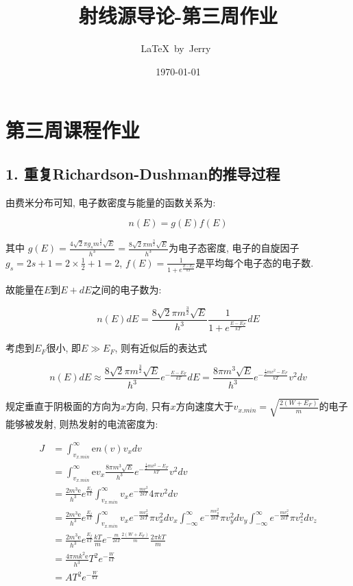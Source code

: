 \documentclass{article}
\title{射线源导论-第三周作业}
\author{\LaTeX\ by\ Jerry\ }
\date{\today}
\begin{document}
\pagestyle{fancy}

\fancyhead[R]{\today}

\section*{第三周课程作业}

\subsection*{1. 重复Richardson-Dushman的推导过程}

由费米分布可知, 电子数密度与能量的函数关系为:

$$n(E) = g(E) f(E)$$

其中 $g(E) = \frac{4\sqrt{2}\pi g_s m^{\frac{3}{2}}\sqrt{E}}{h^3} = \frac{8\sqrt{2}\pi m^{\frac{3}{2}}\sqrt{E}}{h^3}$为电子态密度, 电子的自旋因子$g_s = 2s + 1 = 2 \times \frac{1}{2} + 1 = 2$, $f(E)=\frac{1}{1+e^{\frac{E-E_F}{kT}}}$是平均每个电子态的电子数.

故能量在$E$到$E+dE$之间的电子数为:

$$n(E)dE = \frac{8\sqrt{2}\pi m^{\frac{3}{2}}\sqrt{E}}{h^3} \frac{1}{1+e^{\frac{E-E_F}{kT}}}dE$$

考虑到$E_F$很小, 即$E \gg E_F $, 则有近似后的表达式

$$n(E)dE \approx \frac{8\sqrt{2}\pi m^{\frac{3}{2}}\sqrt{E}}{h^3} e^{- \frac{E-E_F}{kT}}dE = \frac{8\pi m^{3}\sqrt{E}}{h^3} e^{- \frac{\frac{1}{2}mv^2-E_F}{kT}}v^2dv$$

规定垂直于阴极面的方向为$x$方向, 只有$x$方向速度大于$v_{x.min} = \sqrt{\frac{2(W+E_F)}{m}}$的电子能够被发射, 则热发射的电流密度为:

\begin{equation*}
    \begin{aligned}
        J &= \int_{v_{x.min}}^{\infty} \text{e} n(v) v_x dv \\
        &= \int_{v_{x.min}}^{\infty} \text{e} v_x \frac{8\pi m^{3}\sqrt{E}}{h^3} e^{- \frac{\frac{1}{2}mv^2-E_F}{kT}}v^2dv \\
        &= \frac{2m^3\text{e}}{h^3} e^{\frac{E_f}{kT}} \int_{v_{x.min}}^{\infty} v_x e^{-\frac{mv^2}{2kT}}4\pi v^2 dv\\
        &= \frac{2m^3\text{e}}{h^3} e^{\frac{E_f}{kT}} \int_{v_{x.min}}^{\infty} v_x e^{-\frac{mv_x^2}{2kT}}\pi v_x^2 dv_x \int_{-\infty}^{\infty} e^{-\frac{mv_y^2}{2kT}}\pi v_y^2 dv_y \int_{-\infty}^{\infty} e^{-\frac{mv_z^2}{2kT}}\pi v_z^2 dv_z\\
        &= \frac{2m^3\text{e}}{h^3} e^{\frac{E_f}{kT}}\frac{kT}{m}e^{-\frac{m}{2kT}\frac{2(W+E_F)}{m}}\frac{2\pi kT}{m}\\
        &= \frac{4\pi m k^2 \text{e}}{h^3} T^2 e^{-\frac{W}{kT}}\\
        &= A T^2 e^{-\frac{W}{kT}}
    \end{aligned}
\end{equation*}
\end{document}
